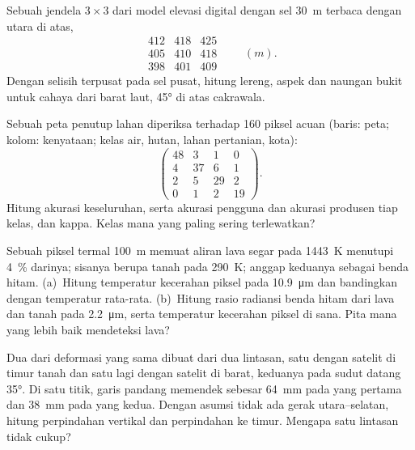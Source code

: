 \begin{exercise}[$\star\star$]\label{exo:b3:remote-sensing-gis:7}
Sebuah jendela $3\times3$ dari model elevasi digital dengan sel \qty{30}{m}
terbaca dengan utara di atas,
\[
\begin{matrix} 412 & 418 & 425 \\ 405 & 410 & 418 \\ 398 & 401 & 409 \end{matrix}
\qquad (\unit{m}).
\]
Dengan selisih terpusat pada sel pusat, hitung lereng, aspek
dan naungan bukit untuk cahaya dari barat laut, \ang{45} di atas
cakrawala.
\end{exercise}

\begin{exercise}[$\star\star$]\label{exo:b3:remote-sensing-gis:8}
Sebuah peta penutup lahan diperiksa terhadap 160 piksel acuan (baris: peta;
kolom: kenyataan; kelas air, hutan, lahan pertanian, kota):
\[
\begin{pmatrix} 48 & 3 & 1 & 0 \\ 4 & 37 & 6 & 1 \\ 2 & 5 & 29 & 2 \\ 0 & 1 & 2 & 19 \end{pmatrix} .
\]
Hitung akurasi keseluruhan, serta akurasi pengguna dan akurasi produsen tiap
kelas, dan kappa. Kelas mana yang paling sering terlewatkan?
\end{exercise}

\begin{exercise}[$\star\star$]\label{exo:b3:remote-sensing-gis:9}
Sebuah piksel termal \qty{100}{m} memuat aliran lava segar pada \qty{1443}{K}
menutupi \qty{4}{\percent} darinya; sisanya berupa tanah pada \qty{290}{K}; anggap
keduanya sebagai benda hitam. (a)~Hitung temperatur kecerahan piksel pada
\qty{10.9}{\micro\metre} dan bandingkan dengan temperatur rata-rata.
(b)~Hitung rasio radiansi benda hitam dari lava dan
tanah pada \qty{2.2}{\micro\metre}, serta temperatur kecerahan piksel
di sana. Pita mana yang lebih baik mendeteksi lava?
\end{exercise}

\begin{exercise}[$\star\star\star$]\label{exo:b3:remote-sensing-gis:10}
Dua  dari deformasi yang sama dibuat dari dua lintasan, satu
dengan satelit di timur tanah dan satu lagi dengan satelit di barat,
keduanya pada sudut datang \ang{35}. Di satu titik, garis
pandang memendek sebesar \qty{64}{mm} pada yang pertama dan \qty{38}{mm} pada
yang kedua. Dengan asumsi tidak ada gerak utara--selatan, hitung perpindahan vertikal dan
perpindahan ke timur. Mengapa satu lintasan tidak cukup?
\end{exercise}

